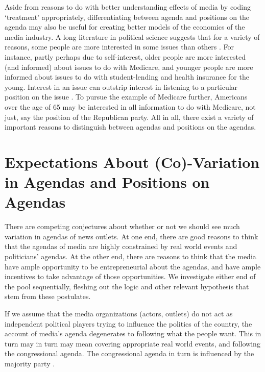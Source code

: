 \documentclass[12pt, letterpaper]{article}
\begin{document}
Aside from reasons to do with better understanding effects of media by coding `treatment' appropriately, differentiating between agenda and positions on the agenda may also be useful for creating better models of the economics of the media industry. A long literature in political science suggests that for a variety of reasons, some people are more interested in some issues than others \citep{iyengar2008selective, krosnick1990government, krosnick1995public}. For instance, partly perhaps due to self-interest, older people are more interested (and informed) about issues to do with Medicare, and younger people are more informed about issues to do with student-lending and health insurance for the young. Interest in an issue can outstrip interest in listening to a particular position on the issue \citep{iyengar2008selective}. To pursue the example of Medicare further, Americans over the age of 65 may be interested in all information to do with Medicare, not just, say the position of the Republican party. All in all, there exist a variety of important reasons to distinguish between agendas and positions on the agendas.

\section*{Expectations About (Co)-Variation in Agendas and Positions on Agendas}

There are competing conjectures about whether or not we should see much variation in agendas of news outlets. At one end, there are good reasons to think that the agendas of media are highly constrained by real world events and politicians' agendas. At the other end, there are reasons to think that the media have ample opportunity to be entrepreneurial about the agendas, and have ample incentives to take advantage of those opportunities. We investigate either end of the pool sequentially, fleshing out the logic and other relevant hypothesis that stem from these postulates. 

If we assume that the media organizations (actors, outlets) do not act as independent political players trying to influence the politics of the country, the account of media's agenda degenerates to following what the people want. This in turn may in turn may mean covering appropriate real world events, and following the congressional agenda. The congressional agenda in turn is influenced by the majority party \citep{gailmard2007negative}. 
\end{document}
